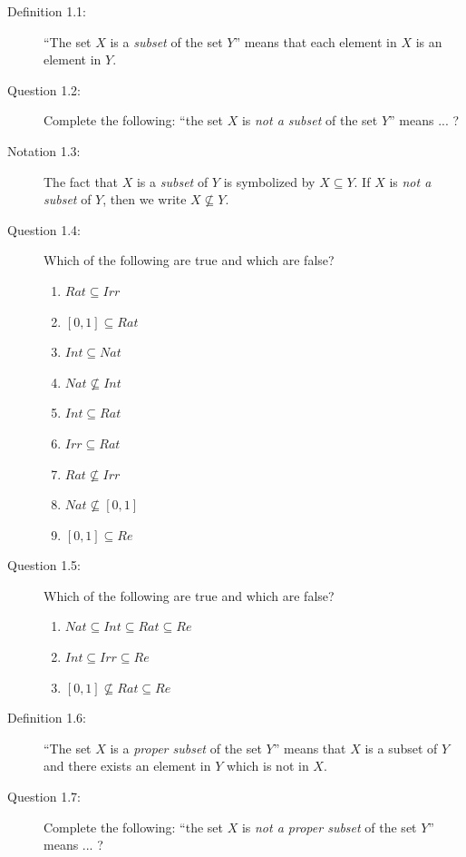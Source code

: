 \documentclass{book}
\begin{document}
\begin{description}

\item[Definition 1.1:] ``The set $X$ is a \emph{subset} of the set $Y$'' means that each element in $X$ is an element in $Y$.

\item[Question 1.2:] Complete the following: ``the set $X$ is \emph{not a subset} of the set $Y$'' means ... ?

\item[Notation 1.3:] The fact that $X$ is a \emph{subset} of $Y$ is symbolized by $X \subseteq Y$. If $X$ is \emph{not a subset} of $Y$, then we write $X \not \subseteq Y$.

\item[Question 1.4:] Which of the following are true and which are false?
\begin{enumerate}[\hspace{1cm}(a)]
  \item $Rat \subseteq Irr$
  \item $[0,1] \subseteq Rat$ 
  \item $Int \subseteq Nat$
  \item $Nat \not \subseteq Int$
  \item $Int \subseteq Rat$
  \item $Irr \subseteq Rat$
  \item $Rat \not \subseteq Irr$
  \item $Nat \not \subseteq [0,1]$
  \item $[0,1] \subseteq Re$
\end{enumerate}

\item[Question 1.5:] Which of the following are true and which are false?
\begin{enumerate}[\hspace{1cm}(a)]
  \item $Nat \subseteq Int \subseteq Rat \subseteq Re$
  \item $Int \subseteq Irr \subseteq Re$
  \item $[0,1] \not \subseteq Rat \subseteq Re$
\end{enumerate}

\item[Definition 1.6:] ``The set $X$ is a \emph{proper subset} of the set $Y$'' means that $X$ is a subset of $Y$ and there exists an element in $Y$ which is not in $X$.

\item[Question 1.7:] Complete the following: ``the set $X$ is \emph{not a proper subset} of the set $Y$'' means ... ?


\end{description}
\end{document}
